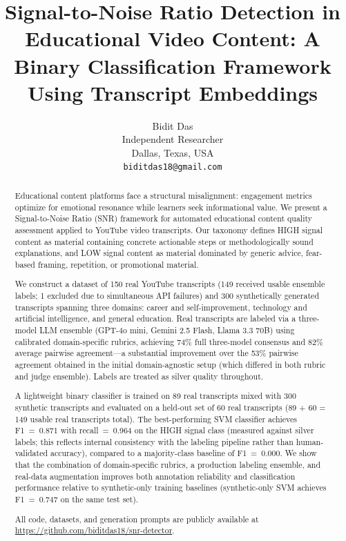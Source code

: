 \documentclass[11pt,a4paper]{article}
\title{Signal-to-Noise Ratio Detection in Educational Video Content: A Binary Classification Framework Using Transcript Embeddings}
\author{%
  Bidit Das \\
  Independent Researcher \\
  Dallas, Texas, USA \\
  \texttt{biditdas18@gmail.com}
}
\begin{document}
\maketitle

\begin{abstract}
Educational content platforms face a structural misalignment: engagement metrics optimize for
emotional resonance while learners seek informational value. We present a Signal-to-Noise Ratio
(SNR) framework for automated educational content quality assessment applied to YouTube video
transcripts. Our taxonomy defines HIGH signal content as material containing concrete actionable
steps or methodologically sound explanations, and LOW signal content as material dominated by
generic advice, fear-based framing, repetition, or promotional material.

We construct a dataset of 150 real YouTube transcripts (149 received usable ensemble labels;
1 excluded due to simultaneous API failures) and 300 synthetically generated transcripts
spanning three domains: career and self-improvement, technology and artificial intelligence, and
general education. Real transcripts are labeled via a three-model LLM ensemble (GPT-4o mini,
Gemini 2.5 Flash, Llama 3.3 70B) using calibrated domain-specific rubrics, achieving 74\% full
three-model consensus and 82\% average pairwise agreement---a substantial improvement over the
53\% pairwise agreement obtained in the initial domain-agnostic setup (which differed in both
rubric and judge ensemble). Labels are treated as
silver quality throughout.

A lightweight binary classifier is trained on 89 real transcripts mixed with 300 synthetic
transcripts and evaluated on a held-out set of 60 real transcripts (89 + 60 = 149 usable real
transcripts total). The best-performing SVM classifier achieves F1~=~0.871 with
recall~=~0.964 on the HIGH signal class (measured against silver labels; this reflects internal
consistency with the labeling pipeline rather than human-validated accuracy), compared to a
majority-class baseline of F1~=~0.000. We show that the combination of domain-specific rubrics, a production labeling ensemble, and
real-data augmentation improves both annotation reliability and classification performance
relative to synthetic-only training baselines (synthetic-only SVM achieves F1~=~0.747 on the
same test set).

All code, datasets, and generation prompts are publicly available at
\url{https://github.com/biditdas18/snr-detector}.
\end{abstract}
\end{document}

